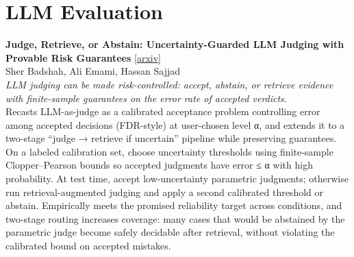 \documentclass[12pt,letterpaper]{article}
\begin{document}
\medskip


\section*{LLM Evaluation}

{\small\textbf{Judge, Retrieve, or Abstain: Uncertainty-Guarded LLM Judging with Provable Risk Guarantees}} {\scriptsize[\href{https://arxiv.org/abs/2608.17994}{arxiv}]}\\
{\scriptsize Sher Badshah, Ali Emami, Hassan Sajjad}\\

{\small\textit{LLM judging can be made risk-controlled: accept, abstain, or retrieve evidence with finite-sample guarantees on the error rate of accepted verdicts.}}\\[1pt]
{\footnotesize Recasts LLM-as-judge as a calibrated acceptance problem controlling error among accepted decisions (FDR-style) at user-chosen level α, and extends it to a two-stage ``judge → retrieve if uncertain'' pipeline while preserving guarantees. On a labeled calibration set, choose uncertainty thresholds using finite-sample Clopper--Pearson bounds so accepted judgments have error ≤ α with high probability. At test time, accept low-uncertainty parametric judgments; otherwise run retrieval-augmented judging and apply a second calibrated threshold or abstain. Empirically meets the promised reliability target across conditions, and two-stage routing increases coverage: many cases that would be abstained by the parametric judge become safely decidable after retrieval, without violating the calibrated bound on accepted mistakes.}

\medskip
\end{document}
